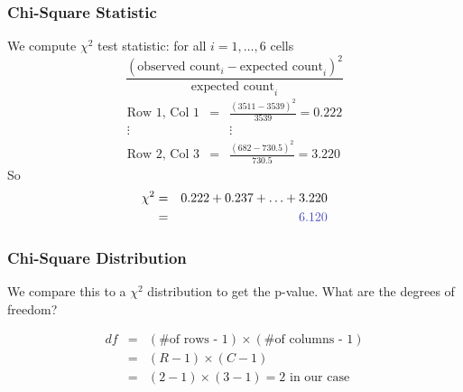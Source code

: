 \documentclass[handout]{beamer}
\newcommand{\blue}[1]{\textcolor{blue2}{#1}}
\begin{document}
%
%
%


\begin{frame}
\frametitle{Chi-Square Statistic}
We compute $\chi^2$ test statistic: for all $i = 1, \ldots, 6$ cells
\[
\frac{(\mbox{observed count}_i - \mbox{expected count}_i)^2}{\mbox{expected count}_i}
\]
\pause
\begin{eqnarray*}
\mbox{Row 1, Col 1} &=& \frac{(3511-3539)^2}{3539} = 0.222 \\
\vdots && \vdots\\
\mbox{Row 2, Col 3} &=& \frac{(682-730.5)^2}{730.5} = 3.220
\end{eqnarray*}
\pause So
\begin{eqnarray*}
\chi^2 &=& 0.222 + 0.237 + \ldots + 3.220\\
&=& \blue{6.120}
\end{eqnarray*}

\end{frame}


\begin{frame}
\frametitle{Chi-Square Distribution}
We compare this to a $\chi^2$ distribution to get the p-value.  What are the degrees of freedom?

\pause \begin{eqnarray*}
df &=& (\mbox{\# of rows - 1}) \times (\mbox{\# of columns - 1})\\
&=& (R-1) \times (C-1)\\
&=& (2-1) \times (3-1) = 2 \mbox{ in our case}
\end{eqnarray*}

\end{frame}
\end{document}
